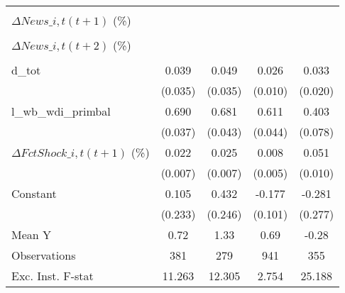 {\begin{tabular}{l*{4}{c}}
                    &                     &                     &                     &                     \\
\addlinespace
$ \Delta News\_{i,t}(t+1)$ (\%)&                     &                     &                     &                     \\
                    &                     &                     &                     &                     \\
\addlinespace
$ \Delta News\_{i,t}(t+2)$ (\%)&                     &                     &                     &                     \\
                    &                     &                     &                     &                     \\
\addlinespace
d\_tot               &       0.039         &       0.049         &       0.026\sym{***}&       0.033         \\
                    &     (0.035)         &     (0.035)         &     (0.010)         &     (0.020)         \\
\addlinespace
l\_wb\_wdi\_primbal    &       0.690\sym{***}&       0.681\sym{***}&       0.611\sym{***}&       0.403\sym{***}\\
                    &     (0.037)         &     (0.043)         &     (0.044)         &     (0.078)         \\
\addlinespace
$ \Delta FctShock\_{i,t}(t+1)$ (\%)&       0.022\sym{***}&       0.025\sym{***}&       0.008         &       0.051\sym{***}\\
                    &     (0.007)         &     (0.007)         &     (0.005)         &     (0.010)         \\
\addlinespace
Constant            &       0.105         &       0.432\sym{*}  &      -0.177\sym{*}  &      -0.281         \\
                    &     (0.233)         &     (0.246)         &     (0.101)         &     (0.277)         \\
\midrule
Mean Y              &        0.72         &        1.33         &        0.69         &       -0.28         \\
Observations        &         381         &         279         &         941         &         355         \\
Exc. Inst. F-stat   &      11.263         &      12.305         &       2.754         &      25.188         \\
\bottomrule
\end{tabular}
}
